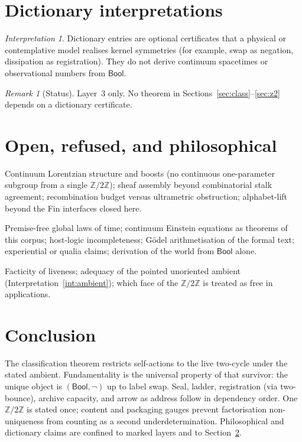 \documentclass[11pt,a4paper]{article}
\theoremstyle{plain}
\theoremstyle{definition}
\theoremstyle{remark}
\newtheorem{remark}[theorem]{Remark}
\newtheorem{interpretation}[theorem]{Interpretation}
\newcommand{\Bool}{\mathsf{Bool}}
\newcommand{\Ztwo}{\mathbb{Z}/2\mathbb{Z}}
\begin{document}
\section{Dictionary interpretations}
\label{sec:dict}

\begin{interpretation}
\label{int:dict}
Dictionary entries are optional certificates that a physical or
contemplative model realises kernel symmetries (for example, swap as
negation, dissipation as registration). They do not derive continuum
spacetimes or observational numbers from $\Bool$.
\end{interpretation}

\begin{remark}[Status]
Layer~3 only. No theorem in Sections~\ref{sec:class}--\ref{sec:z2}
depends on a dictionary certificate.
\end{remark}


\section{Open, refused, and philosophical}
\label{sec:status}

\begin{statusopen}
Continuum Lorentzian structure and boosts (no continuous one-parameter
subgroup from a single $\Ztwo$); sheaf assembly beyond combinatorial
stalk agreement; recombination budget versus ultrametric obstruction;
alphabet-lift beyond the Fin interfaces closed here.
\end{statusopen}

\begin{statusrefused}
Premise-free global laws of time; continuum Einstein equations as
theorems of this corpus; host-logic incompleteness; G\"odel
arithmetisation of the formal text; experiential or qualia claims;
derivation of the world from $\Bool$ alone.
\end{statusrefused}

\begin{statusphil}
Facticity of liveness; adequacy of the pointed unoriented ambient
(Interpretation~\ref{int:ambient}); which face of the $\Ztwo$ is treated
as free in applications.
\end{statusphil}


\section{Conclusion}
\label{sec:concl}

The classification theorem restricts self-actions to the live two-cycle
under the stated ambient. Fundamentality is the universal property of
that survivor: the unique object is $(\Bool,\neg)$ up to label swap.
Seal, ladder, registration (via two-bounce), archive capacity, and arrow
as address follow in dependency order. One $\Ztwo$ is stated once; content
and packaging gauges prevent factorisation non-uniqueness from counting
as a second underdetermination. Philosophical and dictionary claims are
confined to marked layers and to Section~\ref{sec:status}.
\end{document}
